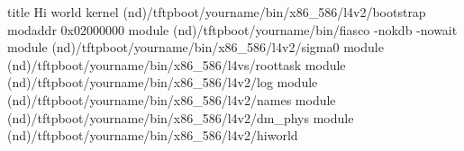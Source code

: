 title Hi world
  kernel (nd)/tftpboot/yourname/bin/x86_586/l4v2/bootstrap
  modaddr 0x02000000
  module (nd)/tftpboot/yourname/bin/fiasco -nokdb -nowait
  module (nd)/tftpboot/yourname/bin/x86_586/l4v2/sigma0
  module (nd)/tftpboot/yourname/bin/x86_586/l4vs/roottask
  module (nd)/tftpboot/yourname/bin/x86_586/l4v2/log
  module (nd)/tftpboot/yourname/bin/x86_586/l4v2/names
  module (nd)/tftpboot/yourname/bin/x86_586/l4v2/dm_phys
  module (nd)/tftpboot/yourname/bin/x86_586/l4v2/hiworld 
